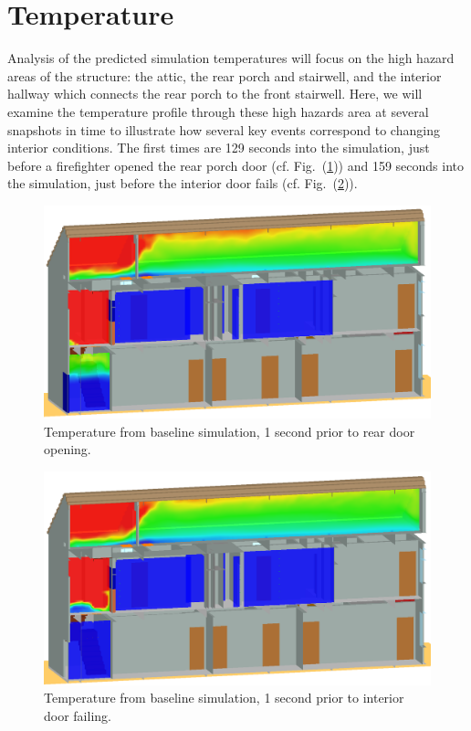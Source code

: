 \documentclass[11pt,oneside]{book}
\begin{document}
\section{Temperature}
Analysis of the predicted simulation temperatures will focus on the high hazard areas of the structure: the attic, the rear porch and stairwell, and the interior hallway which connects the rear porch to the front stairwell. Here, we will examine the temperature profile through these high hazards area at several snapshots in time to illustrate how several key events correspond to changing interior conditions. The first times are 129 seconds into the simulation, just before a firefighter opened the rear porch door (cf. Fig.~(\ref{fig:temp_129s})) and 159 seconds into the simulation, just before the interior door fails (cf. Fig.~(\ref{fig:temp_159s})).

\begin{figure}[!ht]
\includegraphics[width=.675\textwidth]{../Figures/west_50th_baseline_129}
 

\caption{Temperature from baseline simulation, 1 second prior to rear door opening.}
\label{fig:temp_129s}
\end{figure}

\begin{figure}[!ht]
\includegraphics[width=.675\textwidth]{../Figures/west_50th_baseline_159}
 

\caption{Temperature from baseline simulation, 1 second prior to interior door failing.}
\label{fig:temp_159s}
\end{figure}
\end{document}
